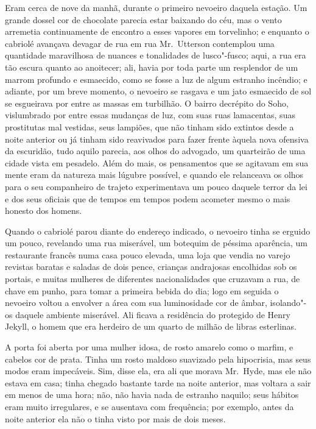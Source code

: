 Eram cerca de nove da manhã, durante o primeiro nevoeiro daquela
estação.  Um grande dossel cor de chocolate parecia estar baixando do
céu, mas o vento arremetia continuamente de encontro a esses vapores em
torvelinho; e enquanto o cabriolé avançava devagar de rua em rua Mr.~Utterson 
contemplou uma quantidade maravilhosa de nuances e tonalidades
de lusco"-fusco; aqui, a rua era tão escura quanto ao anoitecer; ali,
havia por toda parte um resplendor de um marrom profundo e esmaecido,
como se fosse a luz de algum estranho incêndio; e adiante, por um breve
momento, o nevoeiro se rasgava e um jato esmaecido de sol se esgueirava
por entre as massas em turbilhão.  O bairro decrépito do Soho,
vislumbrado por entre essas mudanças de luz, com suas ruas lamacentas,
suas prostitutas mal vestidas, seus lampiões, que não tinham sido
extintos desde a noite anterior ou já tinham sido reavivados para fazer
frente àquela nova ofensiva da escuridão, tudo aquilo parecia, aos
olhos do advogado, um quarteirão de uma cidade vista em pesadelo.  Além
do mais, os pensamentos que se agitavam em sua mente eram da natureza
mais lúgubre possível, e quando ele relanceava os olhos para o seu
companheiro de trajeto experimentava um pouco daquele terror da lei e
dos seus oficiais que de tempos em tempos podem acometer mesmo o mais
honesto dos homens. 

Quando o cabriolé parou diante do endereço indicado, o nevoeiro tinha se
erguido um pouco, revelando uma rua miserável, um botequim de péssima
aparência, um restaurante francês numa casa pouco elevada, uma loja que
vendia no varejo revistas baratas e saladas de dois pence, crianças
andrajosas encolhidas sob os portais, e muitas mulheres de diferentes
nacionalidades que cruzavam a rua, de chave em punho, para tomar a
primeira bebida do dia; logo em seguida o nevoeiro voltou a envolver a
área com sua luminosidade cor de âmbar, isolando"-os daquele ambiente
miserável.  Ali ficava a residência do protegido de Henry Jekyll, o
homem que era herdeiro de um quarto de milhão de libras esterlinas.

A porta foi aberta por uma mulher idosa, de rosto amarelo como o marfim,
e cabelos cor de prata.  Tinha um rosto maldoso suavizado pela
hipocrisia, mas seus modos eram impecáveis.  Sim, disse ela, era ali
que morava Mr.~Hyde, mas ele não estava em casa; tinha chegado bastante
tarde na noite anterior, mas voltara a sair em menos de uma hora; não,
não havia nada de estranho naquilo; seus hábitos eram muito
irregulares, e se ausentava com frequência; por exemplo, antes da noite
anterior ela não o tinha visto por mais de dois meses.

